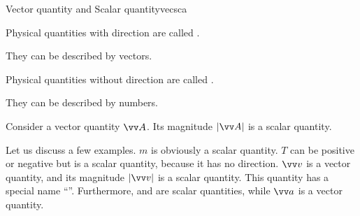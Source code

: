 \documentclass[11pt,pdfa,lastpage]{MishoNote}
\begin{document}
\begin{definition}{Vector quantity and Scalar quantity}{vecsca}
  \begin{miniitemize}
    \item Physical quantities with direction are called .
    \begin{miniitemize} \item They can be described by vectors.\end{miniitemize}
    \item Physical quantities without direction are called .
    \begin{miniitemize} \item They can be described by numbers.\end{miniitemize}
    \item Consider a vector quantity $\vc A$. Its magnitude $|\vc A|$ is a scalar quantity.
  \end{miniitemize}
  \end{definition}
Let us discuss a few examples.
 $m$ is obviously a scalar quantity.  $T$ can be positive or negative but is a scalar quantity, because it has no direction.  $\vc v$ is a vector quantity, and its magnitude $|\vc v|$ is a scalar quantity. This quantity has a special name ``''.
Furthermore,  and  are scalar quantities, while  $\vc a$ is a vector quantity.
\end{document}
